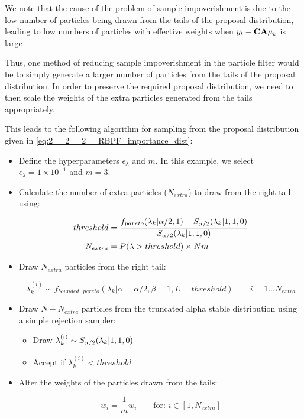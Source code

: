 \documentclass[../main.tex]{subfiles}
\begin{document}
We note that the cause of the problem of sample impoverishment is due to the low number of particles being drawn from the tails of the proposal distribution, leading to low numbers of particles with effective weights when $y_t - {\bf CA\mu}_k$ is large

Thus, one method of reducing sample impoverishment in the particle filter would be to simply generate a larger number of particles from the tails of the proposal distribution. In order to preserve the required proposal distribution, we need to then scale the weights of the extra particles generated from the tails appropriately. 

This leads to the following algorithm for sampling from the proposal distribution given in \autoref{eq:2__2__2__RBPF_importance_dist}: 

\begin{itemize}
	
	\item Define the hyperparameters $\epsilon_\lambda$ and $m$. In this example, we select $\epsilon_\lambda = 1 \times 10^{-1}$ and $m=3$.
	
	\item Calculate the number of extra particles ($N_{extra}$) to draw from the right tail using: 
	
	\begin{align}
	threshold &= \frac{f_{pareto}(\lambda_k | \alpha/2, 1) - S_{\alpha/2}(\lambda_k | 1,1,0)}{S_{\alpha/2}(\lambda_k | 1,1,0)} \\
	N_{extra} &= P(\lambda > threshold) \times Nm
	\end{align} 
	
	\item Draw $N_{extra}$ particles from the right tail:
	
	\begin{equation}
	\lambda_k^{(i)} \sim f_{bounded \text{ }pareto}(\lambda_k | \alpha = \alpha/2, \beta = 1, L = threshold) \qquad i=1...N_{extra}
	\end{equation}
	
	\item Draw $N - N_{extra}$ particles from the truncated alpha stable distribution using a simple rejection sampler:
	
	\begin{itemize}
		\item Draw $\lambda_k^{(i)} \sim S_{\alpha/2}(\lambda_k | 1, 1, 0)$
		\item Accept if $\lambda_k^{(i)} < threshold$
	\end{itemize}
	
	\item Alter the weights of the particles drawn from the tails:
	
	$$w_i = \frac{1}{m} w_i \qquad \text{for: } i \in [1, N_{extra}]$$	
\end{itemize}








\end{document}

